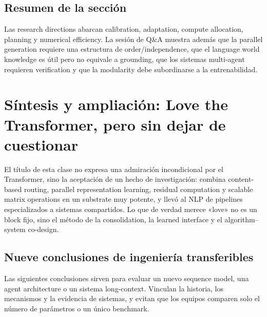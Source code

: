 \documentclass[a4paper]{article}
\begin{document}

\subsection{Resumen de la sección}

Las research directions abarcan calibration, adaptation, compute allocation, planning y numerical efficiency. La sesión de Q\&A muestra además que la parallel generation requiere una estructura de order/independence, que el language world knowledge es útil pero no equivale a grounding, que los sistemas multi-agent requieren verification y que la modularity debe subordinarse a la entrenabilidad.
\section{Síntesis y ampliación: Love the Transformer, pero sin dejar de cuestionar}

El título de esta clase no expresa una admiración incondicional por el Transformer, sino la aceptación de un hecho de investigación: combina content-based routing, parallel representation learning, residual computation y scalable matrix operations en un substrate muy potente, y llevó al NLP de pipelines especializados a sistemas compartidos. Lo que de verdad merece «love» no es un block fijo, sino el método de la consolidation, la learned interface y el algorithm--system co-design.

\subsection{Nueve conclusiones de ingeniería transferibles}

Las siguientes conclusiones sirven para evaluar un nuevo sequence model, una agent architecture o un sistema long-context. Vinculan la historia, los mecanismos y la evidencia de sistemas, y evitan que los equipos comparen solo el número de parámetros o un único benchmark.
\end{document}
